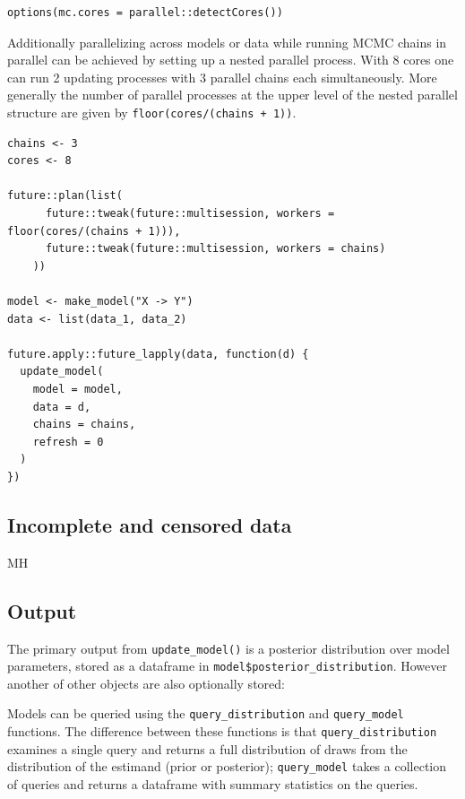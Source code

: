 \documentclass[
  article]{jss}
\begin{document}
\begin{verbatim}
options(mc.cores = parallel::detectCores())
\end{verbatim}

Additionally parallelizing across models or data while running MCMC
chains in parallel can be achieved by setting up a nested parallel
process. With 8 cores one can run 2 updating processes with 3 parallel
chains each simultaneously. More generally the number of parallel
processes at the upper level of the nested parallel structure are given
by \texttt{floor(cores/(chains\ +\ 1))}.

\begin{verbatim}
chains <- 3
cores <- 8

future::plan(list(
      future::tweak(future::multisession, workers = floor(cores/(chains + 1))),
      future::tweak(future::multisession, workers = chains)
    ))

model <- make_model("X -> Y")
data <- list(data_1, data_2)

future.apply::future_lapply(data, function(d) {
  update_model(
    model = model,
    data = d,
    chains = chains,
    refresh = 0
  )
})
\end{verbatim}

\hypertarget{incomplete-and-censored-data}{%
\subsection{Incomplete and censored
data}\label{incomplete-and-censored-data}}

MH

\hypertarget{output}{%
\subsection{Output}\label{output}}

The primary output from \texttt{update\_model()} is a posterior
distribution over model parameters, stored as a dataframe in
\texttt{model\$posterior\_distribution}. However another of other
objects are also optionally stored:

Models can be queried using the \texttt{query\_distribution} and
\texttt{query\_model} functions. The difference between these functions
is that \texttt{query\_distribution} examines a single query and returns
a full distribution of draws from the distribution of the estimand
(prior or posterior); \texttt{query\_model} takes a collection of
queries and returns a dataframe with summary statistics on the queries.
\end{document}
